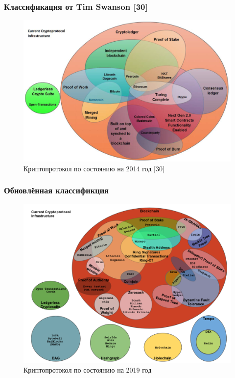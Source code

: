\documentclass{beamer}
\begin{document}
\begin{frame}
    \frametitle{Классификация от Tim Swanson [30]}
    \begin{figure}
        \includegraphics[width=0.9\columnwidth]{current_protocols}
        \caption{Криптопротокол по состоянию на 2014 год [30]}
    \end{figure}
\end{frame}

\begin{frame}
    \frametitle{Обновлённая классификция}
    \begin{figure}
        \includegraphics[width=0.8\columnwidth]{myprotocol_w_title}
        \caption{Криптопротокол по состоянию на 2019 год}
    \end{figure}
\end{frame}
\end{document}
